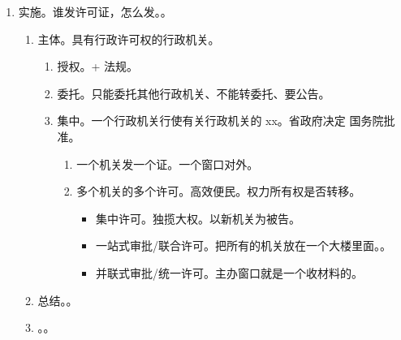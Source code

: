 \begin{enumerate}
\begin{enumerate}
                \begin{enumerate}
                  \item {}。
                  \item {}。
                  \item {}。
                  \item {}。
                \end{enumerate}
        \end{enumerate}
  \item 实施。谁发许可证，怎么发。。
        \begin{enumerate}
          \item 主体。具有行政许可权的行政机关。
                \begin{enumerate}
                  \item 授权。+ 法规。
                  \item 委托。只能委托其他行政机关、不能转委托、要公告。
                  \item 集中。一个行政机关行使有关行政机关的 xx。省政府决定 \yjt 国务院批准。
                        \begin{enumerate}
                          \item 一个机关发一个证。一个窗口对外。
                          \item 多个机关的多个许可。高效便民。权力所有权是否转移。
                                \begin{itemize}
                                  \item 集中许可。独揽大权。以新机关为被告。
                                  \item 一站式审批/联合许可。把所有的机关放在一个大楼里面。。
                                  \item 并联式审批/统一许可。主办窗口就是一个收材料的。
                                \end{itemize}
                        \end{enumerate}
                \end{enumerate}
          \item 总结。。
          \item {}。。

\end{enumerate}
\end{enumerate}
